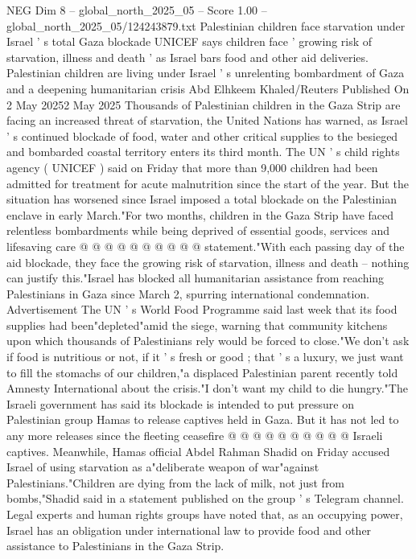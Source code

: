 \begin{textsample}{NEG Dim 8 – global\_north\_2025\_05 – Score 1.00 – global\_north\_2025\_05/124243879.txt}  \label{ex:f8_neg_417}
Palestinian children face starvation under Israel ' s total Gaza blockade UNICEF says children face ' growing risk of starvation, illness and death ' as Israel bars food and other aid deliveries.
Palestinian children are living under Israel ' s unrelenting bombardment of Gaza and a deepening humanitarian crisis Abd Elhkeem Khaled/Reuters Published On 2 May 20252 May 2025 Thousands of Palestinian children in the Gaza Strip are facing an increased threat of starvation, the United Nations has warned, as Israel ' s continued blockade of food, water and other critical supplies to the besieged and bombarded coastal territory enters its third month.
The UN ' s child rights agency ( UNICEF ) said on Friday that more than 9,000 children had been admitted for treatment for acute malnutrition since the start of the year.
But the situation has worsened since Israel imposed a total blockade on the Palestinian enclave in early March."For two months, children in the Gaza Strip have faced relentless bombardments while being deprived of essential goods, services and lifesaving care @ @ @ @ @ @ @ @ @ @ statement."With each passing day of the aid blockade, they face the growing risk of starvation, illness and death -- nothing can justify this."Israel has blocked all humanitarian assistance from reaching Palestinians in Gaza since March 2, spurring international condemnation.
Advertisement The UN ' s World Food Programme said last week that its food supplies had been"depleted"amid the siege, warning that community kitchens upon which thousands of Palestinians rely would be forced to close."We don't ask if food is nutritious or not, if it ' s fresh or good ; that ' s a luxury, we just want to fill the stomachs of our children,"a displaced Palestinian parent recently told Amnesty International about the crisis."I don't want my child to die hungry."The Israeli government has said its blockade is intended to put pressure on Palestinian group Hamas to release captives held in Gaza.
But it has not led to any more releases since the fleeting ceasefire @ @ @ @ @ @ @ @ @ @ Israeli captives.
Meanwhile, Hamas official Abdel Rahman Shadid on Friday accused Israel of using starvation as a"deliberate weapon of war"against Palestinians."Children are dying from the lack of milk, not just from bombs,"Shadid said in a statement published on the group ' s Telegram channel.
Legal experts and human rights groups have noted that, as an occupying power, Israel has an obligation under international law to provide food and other assistance to Palestinians in the Gaza Strip.

\end{textsample}
